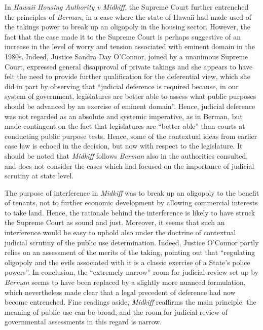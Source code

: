 In {\it Hawaii Housing Authority v Midkiff}, the Supreme Court further entrenched the principles of {\it Berman}, in a case where the state of Hawaii had made used of the takings power to break up an oligopoly in the housing sector.  However, the fact that the case made it to the Supreme Court is perhaps suggestive of an increase in the level of worry and tension associated with eminent domain in the 1980s. Indeed, Justice Sandra Day O'Connor, joined by a unanimous Supreme Court, expressed general disapproval of private takings and she appears to have felt the need to provide further qualification for the deferential view, which she did in part by observing that ``judicial deference is required because, in our system of government, legislatures are better able to assess what public purposes should be advanced by an exercise of eminent domain''. Hence, judicial deference was not regarded as an absolute and systemic imperative, as in Berman, but made contingent on the fact that legislatures are ``better able'' than courts at conducting public purpose tests. Hence, some of the contextual ideas from earlier case law is echoed in the decision, but now with respect to the legislature. It should be noted that {\it Midkiff} follows {\it Berman} also in the authorities consulted, and does not consider the cases which had focused on the importance of judicial scrutiny at state level.

The purpose of interference in {\it Midkiff} was to break up an oligopoly to the benefit of tenants, not to further economic development by allowing commercial interests to take land. Hence, the rationale behind the interference is likely to have struck the Supreme Court as sound and just. Moreover, it seems that such an interference would be easy to uphold also under the doctrine of contextual judicial scrutiny of the public use determination. Indeed, Justice O'Connor partly relies on an assessment of the merits of the taking, pointing out that  ``regulating oligopoly and the evils associated with it is a classic exercise of a State's police powers''. In conclusion, the ``extremely narrow'' room for judicial review set up by {\it Berman} seems to have been replaced by a slightly more nuanced formulation, which nevertheless made clear that a legal precedent of deference had now become entrenched. Fine readings aside, {\it Midkiff} reaffirms the main principle:  the meaning of public use can be broad, and the room for judicial review of governmental assessments in this regard is narrow.

